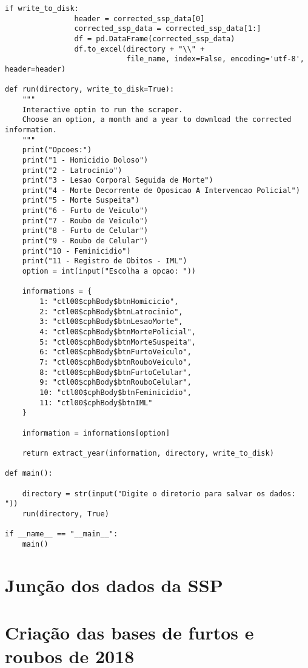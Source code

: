 \documentclass[
	12pt,
	openright,			%
	twoside,			%
	a4paper,			%
	chapter=TITLE,		%
	section=TITLE,		%
	subsection=TITLE,	%
	subsubsection=TITLE,%
	english,			%
	french,				%
	spanish,			%
	brazil				%
	]{abntex2}
\begin{document}
\begin{anexosenv}
\begin{lstlisting}[frame=single]
            if write_to_disk:
                header = corrected_ssp_data[0]
                corrected_ssp_data = corrected_ssp_data[1:]
                df = pd.DataFrame(corrected_ssp_data)
                df.to_excel(directory + "\\" +
                            file_name, index=False, encoding='utf-8', header=header)

def run(directory, write_to_disk=True):
    """
    Interactive optin to run the scraper.
    Choose an option, a month and a year to download the corrected information.
    """
    print("Opcoes:")
    print("1 - Homicidio Doloso")
    print("2 - Latrocinio")
    print("3 - Lesao Corporal Seguida de Morte")
    print("4 - Morte Decorrente de Oposicao A Intervencao Policial")
    print("5 - Morte Suspeita")
    print("6 - Furto de Veiculo")
    print("7 - Roubo de Veiculo")
    print("8 - Furto de Celular")
    print("9 - Roubo de Celular")
    print("10 - Feminicidio")
    print("11 - Registro de Obitos - IML")
    option = int(input("Escolha a opcao: "))

    informations = {
        1: "ctl00$cphBody$btnHomicicio",
        2: "ctl00$cphBody$btnLatrocinio",
        3: "ctl00$cphBody$btnLesaoMorte",
        4: "ctl00$cphBody$btnMortePolicial",
        5: "ctl00$cphBody$btnMorteSuspeita",
        6: "ctl00$cphBody$btnFurtoVeiculo",
        7: "ctl00$cphBody$btnRouboVeiculo",
        8: "ctl00$cphBody$btnFurtoCelular",
        9: "ctl00$cphBody$btnRouboCelular",
        10: "ctl00$cphBody$btnFeminicidio",
        11: "ctl00$cphBody$btnIML"
    }

    information = informations[option]

    return extract_year(information, directory, write_to_disk)

def main():

    directory = str(input("Digite o diretorio para salvar os dados: "))
    run(directory, True)

if __name__ == "__main__":
    main()
\end{lstlisting}

\chapter{Junção dos dados da SSP}


\chapter{Criação das bases de furtos e roubos de 2018}



\end{anexosenv}
\end{document}
